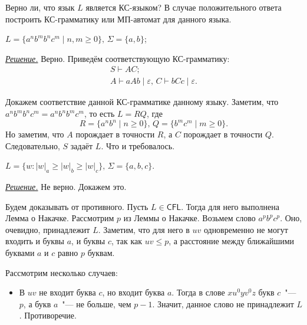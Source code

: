 \documentclass[10pt]{article}
\newcounter{pr} \setcounter{pr}{0}
\newcounter{subpr}[pr] \setcounter{subpr}{0}
\newenvironment{sol}
  {\par
   {\itshape \underline{Решение.}}}
  {}
\newcommand{\eps}{\varepsilon}
\renewcommand{\geq}{\geqslant}
\renewcommand{\leq}{\leqslant}
\newcommand{\CFL}{\mathsf{CFL}}
\begin{document}
  \title{\ptitle}
  \author{\pauthor, \pgroup}
  \date{\pdate}
  \maketitle
  \thispagestyle{fancytitlepage}
  \begin{pr}
    Верно ли, что язык $L$ является КС-языком? В случае положительного ответа
    построить КС-грамматику или МП-автомат для данного языка.
    \begin{subpr}
      $L = \{ a^n b^m b^n c^m \mid n, m \geq 0 \},\, \Sigma = \{a, b\}$;
      \begin{sol}
        Верно. Приведём соответствующую КС-грамматику:
        \begin{gather*}
          S \vdash AC;\\
          A \vdash aAb \mid \eps,\, C \vdash bCc \mid \eps.
        \end{gather*}

        Докажем соответствие данной КС-грамматике данному языку. Заметим, что
        $a^n b^m b^n c^m = a^n b^n b^m c^m$, то есть $L = RQ$, где
        \[
          R = \{a^n b^n \mid n \geq 0\},\,
          Q = \{b^m c^m \mid m \geq 0\}.
        \]
        Но заметим, что $A$ порождает в точности $R$, а $C$ порождает в точности
        $Q$. Следовательно, $S$ задаёт $L$. Что и требовалось.
      \end{sol}
    \end{subpr}
    \begin{subpr}
      $L = \{ w : |w|_a \geq |w|_b \geq |w|_c \},\, \Sigma = \{a, b, c\}$.
      \begin{sol}
        Не верно. Докажем это.

        Будем доказывать от противного. Пусть $L \in \CFL$. Тогда для него
        выполнена Лемма о Накачке. Рассмотрим $p$ из Леммы о Накачке. Возьмем
        слово $a^p b^p c^p$. Оно, очевидно, принадлежит $L$. Заметим, что для
        него в $uv$ одновременно не могут входить и буквы $a$, и буквы $c$, так
        как $uv \leq p$, а расстояние между ближайшими буквами $a$ и $c$ равно
        $p$ буквам.

        Рассмотрим несколько случаев:
        \begin{itemize}
          \item В $uv$ не входит буква $c$, но входит буква $a$. Тогда в
          слове $x u^0 y v^0 z$ букв $c$~"--- $p$, а букв $a$~"--- не больше, чем
          $p - 1$. Значит, данное слово не принадлежит $L$. Противоречие.


\end{itemize}
\end{sol}
\end{subpr}
\end{pr}
\end{document}
